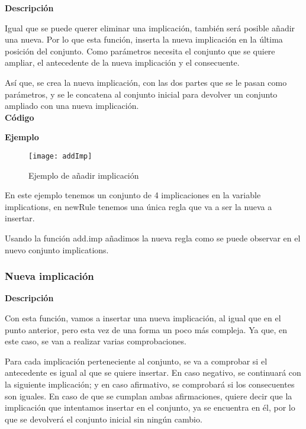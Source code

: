     \textbf{Descripci\'on}

    Igual que se puede querer eliminar una implicaci\'on, tambi\'en ser\'a posible a\~nadir una nueva. Por lo que esta funci\'on, 
    inserta la nueva implicaci\'on en la \'ultima posici\'on del conjunto. Como par\'ametros necesita el conjunto que se quiere ampliar, 
    el antecedente de la nueva implicaci\'on y el consecuente.

    As\'i que, se crea la nueva implicaci\'on, con las dos partes que se le pasan como par\'ametros, y se le concatena al conjunto 
    inicial para devolver un conjunto ampliado con una nueva implicaci\'on.
    \\


    \textbf{C\'odigo}

    
    \bigskip

    \textbf{Ejemplo}

    \begin{figure}[H]
        \centering
        \texttt{[image: addImp]}
        \caption{Ejemplo de a\~nadir implicaci\'on}
        \label{fig:addImp}
    \end{figure}

    En este ejemplo tenemos un conjunto de 4 implicaciones en la variable implications, en newRule tenemos una \'unica regla que va 
    a ser la nueva a insertar. 

    Usando la funci\'on add.imp a\~nadimos la nueva regla como se puede observar en el nuevo conjunto implications.



\subsubsection{Nueva implicaci\'on}

    \textbf{Descripci\'on}

    Con esta funci\'on, vamos a insertar una nueva implicaci\'on, al igual que en el punto anterior, pero esta vez 
    de una forma un poco m\'as compleja. Ya que, en este caso, se van a realizar varias comprobaciones.

    Para cada implicaci\'on perteneciente al conjunto, se va a comprobar si el antecedente es igual al que se quiere insertar.
    En caso negativo, se continuar\'a con la siguiente implicaci\'on; y en caso afirmativo, se comprobar\'a si los consecuentes son 
    iguales. En caso de que se cumplan ambas afirmaciones, quiere decir que la implicaci\'on que intentamos insertar en el conjunto, 
    ya se encuentra en \'el, por lo que se devolver\'a el conjunto inicial sin ning\'un cambio.

